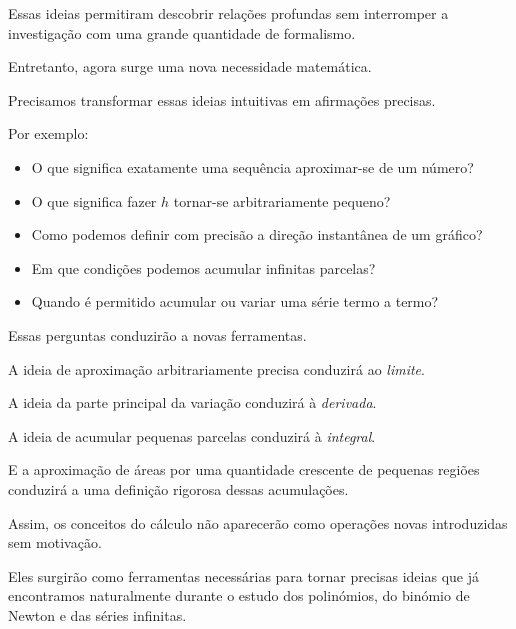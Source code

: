 \documentclass[12pt,a4paper]{article}
\begin{document}
Essas ideias permitiram descobrir relações profundas sem interromper a
investigação com uma grande quantidade de formalismo.

Entretanto, agora surge uma nova necessidade matemática.

Precisamos transformar essas ideias intuitivas em afirmações precisas.

Por exemplo:

\begin{itemize}
    \item O que significa exatamente uma sequência aproximar-se de um
    número?
    \item O que significa fazer \(h\) tornar-se arbitrariamente pequeno?
    \item Como podemos definir com precisão a direção instantânea de um
    gráfico?
    \item Em que condições podemos acumular infinitas parcelas?
    \item Quando é permitido acumular ou variar uma série termo a termo?
\end{itemize}

Essas perguntas conduzirão a novas ferramentas.

A ideia de aproximação arbitrariamente precisa conduzirá ao
\emph{limite}.

A ideia da parte principal da variação conduzirá à
\emph{derivada}.

A ideia de acumular pequenas parcelas conduzirá à
\emph{integral}.

E a aproximação de áreas por uma quantidade crescente de pequenas
regiões conduzirá a uma definição rigorosa dessas acumulações.

Assim, os conceitos do cálculo não aparecerão como operações novas
introduzidas sem motivação.

Eles surgirão como ferramentas necessárias para tornar precisas ideias
que já encontramos naturalmente durante o estudo dos polinómios,
do binómio de Newton e das séries infinitas.
\end{document}
